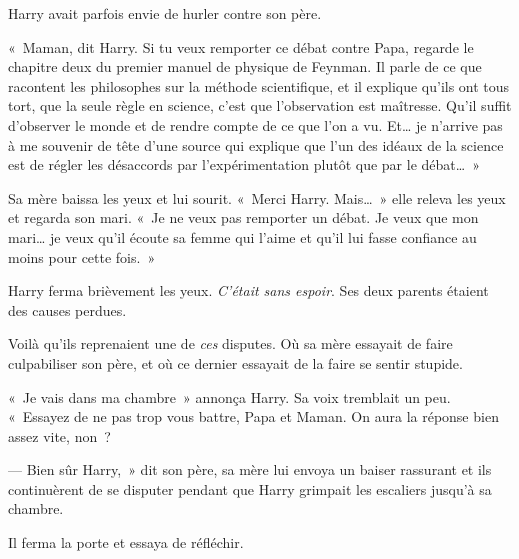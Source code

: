 Harry avait parfois envie de hurler contre son père.

«~Maman, dit Harry. Si tu veux remporter ce débat contre Papa, regarde le chapitre deux du premier manuel de physique de Feynman. Il parle de ce que racontent les philosophes sur la méthode scientifique, et il explique qu'ils ont tous tort, que la seule règle en science, c'est que l'observation est maîtresse. Qu'il suffit d'observer le monde et de rendre compte de ce que l'on a vu. Et… je n'arrive pas à me souvenir de tête d'une source qui explique que l'un des idéaux de la science est de régler les désaccords par l'expérimentation plutôt que par le débat…~»

Sa mère baissa les yeux et lui sourit. «~Merci Harry. Mais…~» elle releva les yeux et regarda son mari. «~Je ne veux pas remporter un débat. Je veux que mon mari… je veux qu'il écoute sa femme qui l'aime et qu'il lui fasse confiance au moins pour cette fois.~»

Harry ferma brièvement les yeux. \emph{C'était sans espoir}. Ses deux parents étaient des causes perdues.

Voilà qu'ils reprenaient une de \emph{ces} disputes. Où sa mère essayait de faire culpabiliser son père, et où ce dernier essayait de la faire se
sentir stupide.

«~Je vais dans ma chambre~» annonça Harry. Sa voix tremblait un peu. «~Essayez de ne pas trop vous battre, Papa et Maman. On aura la réponse bien assez vite, non~?

--- Bien sûr Harry,~» dit son père, sa mère lui envoya un baiser rassurant et ils continuèrent de se disputer pendant que Harry grimpait les escaliers jusqu'à sa chambre.

Il ferma la porte et essaya de réfléchir.

